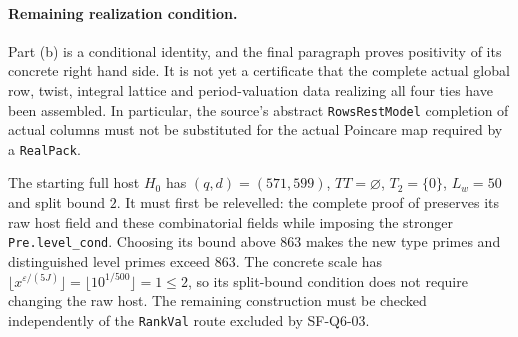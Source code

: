 \documentclass[11pt,a4paper]{article}
\theoremstyle{definition}
\theoremstyle{remark}
\begin{document}
\paragraph{Remaining realization condition.}
Part (b) is a conditional identity, and the final paragraph proves
positivity of its concrete right hand side.  It is not yet a
certificate that the complete actual global row, twist, integral
lattice and period-valuation data realizing all four ties have
been assembled.  In particular, the source's abstract
\texttt{RowsRestModel} completion of actual columns must not be
substituted for the actual Poincare map required by a
\texttt{RealPack}.

The starting full host $H_0$ has $(q,d)=(571,599)$,
$TT=\varnothing$, $T_2=\{0\}$, $L_w=50$ and split bound $2$.
It must first be relevelled: the complete proof of
 preserves its raw host
field and these combinatorial fields while imposing the stronger
\texttt{Pre.level\_cond}.  Choosing its bound above $863$ makes
the new type primes and distinguished level primes exceed $863$.
The concrete scale has
$\lfloor x^{\varepsilon/(5J)}\rfloor
 =\lfloor10^{1/500}\rfloor=1\le2$,
so its split-bound condition does not require changing the raw host.
The remaining construction must be checked independently of the
\texttt{RankVal} route excluded by SF-Q6-03.
\end{document}
